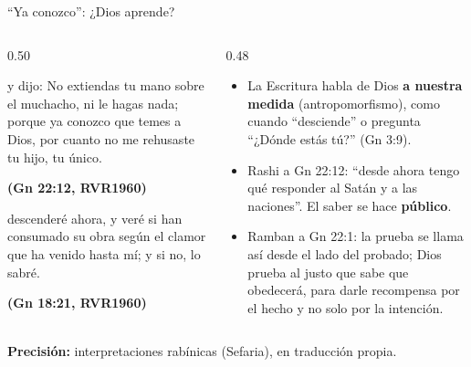 \documentclass[hyperref={bookmarks=false},aspectratio=169]{beamer}
\newcommand{\fuente}[1]{\par\hfill{\upshape\bfseries\footnotesize\textcolor{azul}{#1}}}
\newcommand{\destacar}[1]{\textbf{\textcolor{azul}{#1}}}
\newcommand{\precision}[1]{{\footnotesize\color{gris}\textbf{Precisión:} #1}}
\begin{document}
\begin{frame}{``Ya conozco'': ¿Dios aprende?}
\begin{columns}[t,onlytextwidth]
\begin{column}{0.50\textwidth}
\begin{cita}y dijo: No extiendas tu mano sobre el muchacho, ni le hagas nada; porque ya conozco que temes a Dios, por cuanto no me rehusaste tu hijo, tu único.\fuente{(Gn 22:12, RVR1960)}\end{cita}
\begin{cita}descenderé ahora, y veré si han consumado su obra según el clamor que ha venido hasta mí; y si no, lo sabré.\fuente{(Gn 18:21, RVR1960)}\end{cita}
\end{column}
\begin{column}{0.48\textwidth}\small
\begin{itemize}
\item La Escritura habla de Dios \destacar{a nuestra medida} (antropomorfismo), como cuando ``desciende'' o pregunta ``¿Dónde estás tú?'' (Gn 3:9).
\item Rashi a Gn 22:12: ``desde ahora tengo qué responder al Satán y a las naciones''. El saber se hace \destacar{público}.
\item Ramban a Gn 22:1: la prueba se llama así desde el lado del probado; Dios prueba al justo que sabe que obedecerá, para darle recompensa por el hecho y no solo por la intención.
\end{itemize}
\end{column}
\end{columns}\par\smallskip
\precision{interpretaciones rabínicas (Sefaria), en traducción propia.}
\end{frame}
\end{document}
